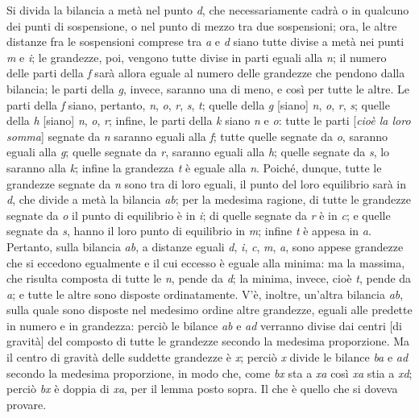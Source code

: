 \documentclass[11pt,twoside,openany]{book}
\begin{document}
Si divida la bilancia a metà nel punto \emph{d}, che necessariamente cadrà o in qualcuno dei punti di sospensione, o nel punto di mezzo tra due sospensioni; ora, le altre distanze fra le sospensioni comprese tra \emph{a} e \emph{d} siano tutte divise a metà nei punti \emph{m} e \emph{i}; le grandezze, poi, vengono tutte divise in parti eguali alla \emph{n}; il numero delle parti della \emph{f} sarà allora eguale al numero delle grandezze che pendono dalla bilancia; le parti della \emph{g}, invece, saranno una di meno, e così per tutte le altre. Le parti della \emph{f} siano, pertanto, \emph{n}, \emph{o}, \emph{r}, \emph{s}, \emph{t}; quelle della \emph{g} [siano] \emph{n}, \emph{o}, \emph{r}, \emph{s}; quelle della \emph{h} [siano] \emph{n}, \emph{o}, \emph{r}; infine, le parti della \emph{k} siano \emph{n} e \emph{o}: tutte le parti [\emph{cioè la loro somma}] segnate da \emph{n} saranno eguali alla \emph{f}; tutte quelle segnate da \emph{o}, saranno eguali alla \emph{g}; quelle segnate da \emph{r}, saranno eguali alla \emph{h}; quelle segnate da \emph{s}, lo saranno alla \emph{k}; infine la grandezza \emph{t} è eguale alla \emph{n}. Poiché, dunque, tutte le grandezze segnate da \emph{n} sono tra di loro eguali, il punto del loro equilibrio sarà in \emph{d}, che divide a metà la bilancia \emph{ab}; per la medesima ragione, di tutte le grandezze segnate da \emph{o} il punto di equilibrio è in \emph{i}; di quelle segnate da \emph{r} è in \emph{c}; e quelle segnate da \emph{s}, hanno il loro punto di equilibrio in \emph{m}; infine \emph{t} è appesa in \emph{a}. Pertanto, sulla bilancia \emph{ab}, a distanze eguali \emph{d}, \emph{i}, \emph{c}, \emph{m}, \emph{a}, sono appese grandezze che si eccedono egualmente e il cui eccesso è eguale alla minima: ma la massima, che risulta composta di tutte le \emph{n}, pende da \emph{d}; la minima, invece, cioè \emph{t}, pende da \emph{a}; e tutte le altre sono disposte ordinatamente. V'è, inoltre, un'altra bilancia \emph{ab}, sulla quale sono disposte nel medesimo ordine altre grandezze, eguali alle predette in numero e in grandezza: perciò le bilance \emph{ab} e \emph{ad} verranno divise dai centri [di gravità] del composto di tutte le grandezze secondo la medesima proporzione. Ma il centro di gravità delle suddette grandezze è \emph{x}; perciò \emph{x} divide le bilance \emph{ba} e \emph{ad} secondo la medesima proporzione, in modo che, come \emph{bx} sta a \emph{xa} così \emph{xa} stia a \emph{xd}; perciò \emph{bx} è doppia di \emph{xa}, per il lemma posto sopra. Il che è quello che si doveva provare.
\end{document}
